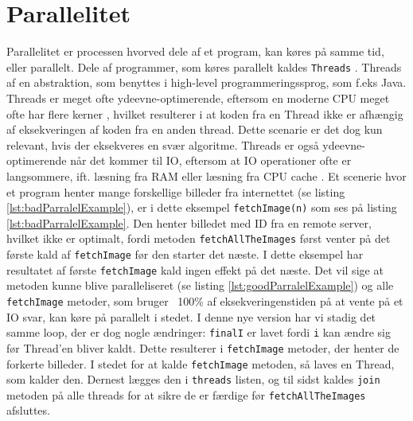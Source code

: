 \section{Parallelitet}\label{ch:parallelitet}
Parallelitet er processen hvorved dele af et program, kan køres på samme tid, eller parallelt. Dele af programmer, som køres parallelt kaldes \texttt{Threads} \cite{JavaThreads}. Threads af en abstraktion, som benyttes i high-level programmeringssprog, som f.eks Java\cite{HighLevel}. Threads er meget ofte ydeevne-optimerende, eftersom en moderne CPU meget ofte har flere kerner \cite{MultiCores}, hvilket resulterer i at koden fra en Thread ikke er afhængig af eksekveringen af koden fra en anden thread. Dette scenarie er det dog kun relevant, hvis der eksekveres en svær algoritme. Threads er også ydeevne-optimerende når det kommer til IO, eftersom at IO operationer ofte er langsommere, ift. læsning fra RAM eller læsning fra CPU cache \cite{OperatingSystems}. Et scenerie hvor et program henter mange forskellige billeder fra internettet (se listing \ref{lst:badParralelExample}), er i dette eksempel \texttt{fetchImage(n)} som ses på listing \ref{lst:badParralelExample}. Den henter billedet med ID fra en remote server, hvilket ikke er optimalt, fordi metoden \texttt{fetchAllTheImages} først venter på det første kald af \texttt{fetchImage} før den starter det næste. I dette eksempel har resultatet af første \texttt{fetchImage} kald ingen effekt på det næste. Det vil sige at metoden kunne blive paralleliseret (se listing \ref{lst:goodParralelExample}) og alle \texttt{fetchImage} metoder, som bruger ~100\% af eksekveringenstiden på at vente på et IO svar, kan køre på parallelt i stedet. I denne nye version har vi stadig det samme loop, der er dog nogle ændringer: \texttt{finalI} er lavet fordi \texttt{i} kan ændre sig før Thread'en bliver kaldt. Dette resulterer i \texttt{fetchImage} metoder, der henter de forkerte billeder. I stedet for at kalde \texttt{fetchImage} metoden, så laves en Thread, som kalder den. 
Dernest lægges den i \texttt{threads} listen, og til sidst kaldes \texttt{join} metoden på alle threads for at sikre de er færdige før \texttt{fetchAllTheImages} afsluttes.


